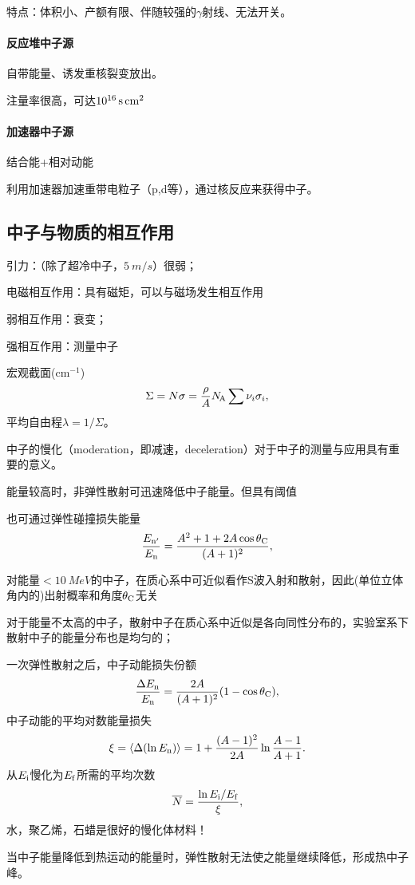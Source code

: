 特点：体积小、产额有限、伴随较强的$\gamma$射线、无法开关。
\paragraph{反应堆中子源}自带能量、诱发重核裂变放出。

注量率很高，可达$\SI{E16}{/s.cm^2}$
\paragraph{加速器中子源}结合能+相对动能

利用加速器加速重带电粒子（p,d等），通过核反应来获得中子。
\subsection{中子与物质的相互作用}
\begin{compactitem}
	\item 引力：（除了超冷中子，$\SI{5}{m/s}$）很弱；
	\item 电磁相互作用：具有磁矩，可以与磁场发生相互作用
	\item 弱相互作用：衰变；
	\item 强相互作用：测量中子
\end{compactitem}
宏观截面(cm$^{-1}$)
\[
	\Sigma=N\sigma=\frac\rho{A}N_{\hspace{-1 pt}\mathrm A}\sum\nu_i\sigma_i,
\]
平均自由程$\lambda=1/\Sigma$。

中子的慢化（moderation，即减速，deceleration）对于中子的测量与应用具有重要的意义。
\begin{compactitem}
	\item 能量较高时，非弹性散射可迅速降低中子能量。但具有阈值
	\item 也可通过弹性碰撞损失能量
	\[
		\frac{E_{\mathrm n'}}{E_\mathrm n}=\frac{A^2+1+2A\cos\theta_{\mathrm C}}{(A+1)^2},
	\]
\end{compactitem}
对能量$<\SI{10}{MeV}$的中子，在质心系中可近似看作S波入射和散射，因此(单位立体角内的)出射概率和角度$\theta_{\mathrm C}$无关

对于能量不太高的中子，散射中子在质心系中近似是各向同性分布的，实验室系下散射中子的能量分布也是均匀的；

一次弹性散射之后，中子动能损失份额
\[
	\frac{\Delta E_\mathrm n}{E_\mathrm n}=\frac{2A}{(A+1)^2}(1-\cos\theta_{\mathrm C}),
\]
中子动能的平均对数能量损失
\[
	\xi=\left\langle \Delta(\ln E_\mathrm n)\right\rangle=1+\frac{(A-1)^2}{2A}\ln\frac{A-1}{A+1}.
\]
从$E_{\mathrm{i}}$慢化为$E_{\mathrm{f}}$所需的平均次数
\[
	\overline N=\frac{\ln E_{\mathrm{i}}/E_{\mathrm{f}}}{\xi},
\]
水，聚乙烯，石蜡是很好的慢化体材料！

当中子能量降低到热运动的能量时，弹性散射无法使之能量继续降低，形成热中子峰。
